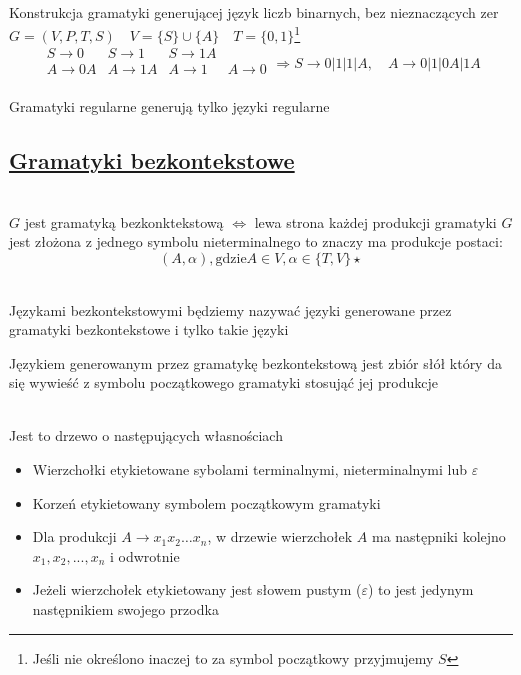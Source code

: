 	\begin{przyklad}
		Konstrukcja gramatyki generującej język liczb binarnych, bez nieznaczących zer \\
		$G = (V, P, T, S) \quad V = \{S\} \cup \{A\} \quad T = \{0, 1\}$\footnote{Jeśli nie określono inaczej to 
		za symbol początkowy przyjmujemy $S$}
		$$
		\begin{matrix}
		S \to 0 & S \to 1 & S \to 1A \\
		A \to 0A & A \to 1A & A \to 1 & A \to 0\\		
		\end{matrix}
		\Rightarrow
		S \to 0|1|1|A, \quad A \to 0|1|0A|1A
		$$
	\end{przyklad}		
	
	\begin{tw}
		Gramatyki regularne generują tylko języki regularne
	\end{tw}
		
\subsection{\href{http://pl.wikipedia.org/wiki/Gramatyka_bezkontekstowa}{Gramatyki bezkontekstowe}}
	
	\begin{df}~\\
		$G$ jest gramatyką bezkonktekstową $\Leftrightarrow$ lewa strona każdej produkcji gramatyki $G$ jest złożona z jednego symbolu
		nieterminalnego to znaczy ma produkcje postaci:
			$$
				(A, \alpha), \text{gdzie} A\in V, \alpha \in \{T,V\}\star
			$$
	\end{df}
	
	\begin{df}~\\
		Językami bezkontekstowymi będziemy nazywać języki generowane przez gramatyki bezkontekstowe i tylko takie języki		
		
		\begin{uwaga}
			Językiem generowanym przez gramatykę bezkontekstową jest zbiór słół który da się wywieść z symbolu początkowego gramatyki stosująć
			jej produkcje
		\end{uwaga}
	\end{df}
	
	\begin{df}~\\
		Jest to drzewo o następujących własnościach
		\begin{itemize}
			\item Wierzchołki etykietowane sybolami terminalnymi, nieterminalnymi lub $\varepsilon$
			\item Korzeń etykietowany symbolem początkowym gramatyki
			\item Dla produkcji $A\rightarrow x_1x_2 \dots x_n$, w drzewie wierzchołek $A$ ma następniki 
			kolejno $x_1, x_2, ..., x_n$ i odwrotnie
			\item Jeżeli wierzchołek etykietowany jest słowem pustym ($\varepsilon$) to jest jedynym
			następnikiem swojego przodka
		\end{itemize}
	\end{df}

